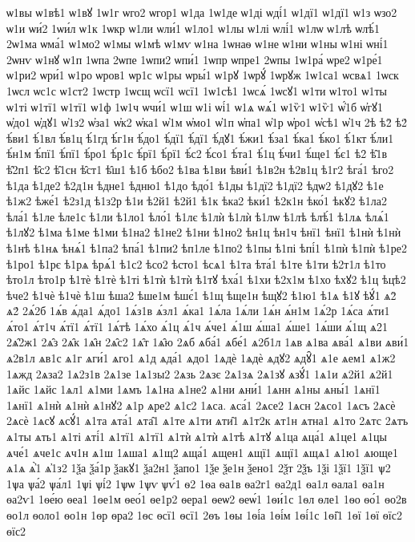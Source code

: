{ѡ1вы
ѡ1вѣ1
ѡ1вꙋ
1ѡ1г
ѡго2
ѡгор1
ѡ1да
1ѡ1де
ѡ1ді
ѡді́1
ѡ1дї1
ѡ1дї1
ѡ1з
ѡзо2
ѡ1и
ѡи́2
1ѡи́л
ѡ1к
1ѡкр
ѡ1ли
ѡли́1
ѡ1ло1
ѡ1лы
ѡ1лі
ѡлі́1
ѡ1лѡ
ѡ1лѣ
ѡлѣ́1
2ѡ1ма
ѡма́1
ѡ1мо2
ѡ1мы
ѡ1мѣ
ѡ1мѵ
ѡ1на
1ѡнаѳ
ѡ1не
ѡ1ни
ѡ1ны
ѡ1ні
ѡні́1
2ѡнѵ
ѡ1нꙋ
ѡ1п
1ѡпа
2ѡпе
1ѡпи2
ѡпи́1
1ѡпр
ѡпре1
2ѡпы
1ѡ1ра́
ѡре2
ѡ1ре́1
ѡ1ри2
ѡри́1
ѡ1ро
ѡров1
ѡр1с
ѡ1ры
ѡры́1
ѡ1рꙋ
1ѡрꙋ́
1ѡрꙋж
1ѡ1са1
ѡсвѧ1
1ѡск
1ѡсл
ѡс1с
ѡ1ст2
1ѡстр
1ѡсщ
ѡсї1
ѡсї1
1ѡ1сѣ1
1ѡсѧ́
1ѡсꙋ1
ѡ1ти
ѡ1то1
ѡ1ты
ѡ1ті
ѡ1тї1
ѡ1тї1
ѡ1ф
1ѡ1ч
ѡчи́1
ѡ1ш
ѡ1і
ѡі́1
ѡ1ѧ
ѡѧ́1
ѡ1ѷ1
ѡ1ѷ1
ѡ҆́1б
ѡ҆гꙋ1
ѡ҆до1
ѡ҆дꙋ1
ѡ҆1з2
ѡ҆за1
ѡ҆к2
ѡ҆ка1
ѡ҆1м
ѡ҆мо1
ѡ҆1п
ѡ҆па1
ѡ҆1р
ѡ҆ро1
ѡ҆сѣ1
ѡ҆1ч
2ѣ
ѣ2̀
ѣ2́
ѣ́ви1
ѣ́1вл
ѣ́в1ц
ѣ́1гд
ѣ́г1н
ѣ́до1
ѣ́дї1
ѣ́дї1
ѣ́дꙋ1
ѣ́жи1
ѣ́за1
ѣ́ка1
ѣ́ко1
ѣ́1кт
ѣ́ли1
ѣ́н1м
ѣ́пї1
ѣ́пї1
ѣ́ро1
ѣ́р1с
ѣ́рї1
ѣ́рї1
ѣ́с2
ѣ́со1
ѣ́та1
ѣ́1ц
ѣ́чи1
ѣ́ще1
ѣ́є1
ѣ2̑
ѣ̑1в
ѣ̑2п1
ѣ̑с2
ѣ̑1сн
ѣ̑ст1
ѣ̑ш1
ѣ1б
ѣбо2
ѣ1ва
ѣ1ви
ѣви́1
ѣ1в2н
ѣ2в1ц
ѣ1г2
ѣга́1
ѣго2
ѣ1да
ѣ1де2
ѣ2д1н
ѣдне1
ѣдню1
ѣ1до
ѣдо́1
ѣ1ды
ѣ1дї2
ѣ1дї2
ѣдѡ2
ѣ1дꙋ2
ѣ1е
ѣ1ж2
ѣже́1
ѣ2з1д
ѣ1з2р
ѣ1и
ѣ2й1
ѣ2й1
ѣ1к
ѣка2
ѣки́1
ѣ2к1н
ѣко́1
ѣкꙋ2
ѣ1ла2
ѣла́1
ѣ1ле
ѣле1с
ѣ1ли
ѣ1ло1
ѣло́1
ѣ1лє
ѣ1лѝ
ѣ1лѝ
ѣ1лѡ
ѣ1лѣ
ѣлѣ́1
ѣ1лѧ
ѣлѧ́1
ѣ1лꙋ2
ѣ1ма
ѣ1ме
ѣ1ми
ѣ1на2
ѣ1не2
ѣ1ни
ѣ1но2
ѣн1ц
ѣн1ч
ѣнї1
ѣнї1
ѣ1нѝ
ѣ1нѝ
ѣ1нѣ
ѣ1нѧ
ѣнѧ́1
ѣ1па2
ѣпа́1
ѣ1пи2
ѣп1ле
ѣ1по2
ѣ1пы
ѣ1пі
ѣпі́1
ѣ1пѝ
ѣ1пѝ
ѣ1ре2
ѣ1ро1
ѣ1рє
ѣ1рѧ
ѣрѧ́1
ѣ1с2
ѣсо2
ѣсто1
ѣсѧ1
ѣ1та
ѣта́1
ѣ1те
ѣ1ти
ѣ2т1л
ѣ1то
ѣто1л
ѣто1р
ѣ1тѐ
ѣ1тѐ
ѣ1ті
ѣ1тѝ
ѣ1тѝ
ѣ1тꙋ
ѣха́1
ѣ1хи
ѣ2х1м
ѣ1хо
ѣхꙋ2
ѣ1ц
ѣцѣ2
ѣче2
ѣ1чѐ
ѣ1чѐ
ѣ1ш
ѣша2
ѣше1м
ѣшє́1
ѣ1щ
ѣще1н
ѣщꙋ2
ѣ1ю1
ѣ1ѧ
ѣ1ꙋ
ѣꙋ́1
ѧ2̀
ѧ2́
2ѧ́2б
1ѧ́в
ѧ́да1
ѧ́до1
1ѧ́з1в
ѧ́зл1
ѧ́ка1
1ѧ́ла
1ѧ́ли
1ѧ́н
ѧ́н1м
1ѧ́2р
1ѧ́са
ѧ́ти1
ѧ́то1
ѧ́т1ч
ѧ́тї1
ѧ́тї1
1ѧ́тѣ
1ѧ́хо
ѧ́1ц
ѧ́1ч
ѧ́че1
ѧ́1ш
ѧ́ша1
ѧ́ше1
1ѧ́ши
ѧ́1щ
ѧ2̑1
2ѧ̑2ж1
2ѧ̑з
2ѧ̑к
1ѧ̑н
2ѧ̑с2
1ѧ̑т
1ѧ̑ю
2ѧб
ѧба́1
ѧбе́1
ѧ2б1л
1ѧв
ѧ1ва
ѧва́1
ѧ1ви
ѧви́1
ѧ2в1л
ѧв1с
ѧ1г
ѧги́1
ѧго1
ѧ1д
ѧда́1
ѧдо1
1ѧдѐ
1ѧдѐ
ѧдꙋ2
ѧдꙋ̑1
ѧ1е
ѧем1
ѧ1ж2
1ѧжд
2ѧза2
1ѧ2з1в
2ѧ1зе
1ѧ1зы2
2ѧзь
2ѧзє
2ѧ1зѧ
2ѧ1зꙋ
ѧзꙋ́1
1ѧ1и
ѧ2й1
ѧ2й1
1ѧйс
1ѧйс
1ѧл1
ѧ1ми
1ѧмъ
1ѧ1на
ѧ1не2
ѧ1ни
ѧни́1
1ѧнн
ѧ1ны
ѧны́1
1ѧнї1
1ѧнї1
ѧ1нѝ
ѧ1нѝ
ѧ1нꙋ2
ѧ1р
ѧре2
ѧ1с2
1ѧса.
ѧса́1
2ѧсе2
1ѧсн
2ѧсо1
1ѧсъ
2ѧсѐ
2ѧсѐ
1ѧсꙋ
ѧсꙋ́1
ѧ1та
ѧта́1
ѧта̑1
ѧ1те
ѧ1ти
ѧти̑1
ѧ1т2к
ѧт1н
ѧтна1
ѧ1то
2ѧтс
2ѧтъ
ѧ1ты
ѧть1
ѧ1ті
ѧті́1
ѧ1тї1
ѧ1тї1
ѧ1тѝ
ѧ1тѝ
ѧ1тѣ
ѧ1тꙋ
ѧ1ца
ѧца́1
ѧ1це1
ѧ1цы
ѧче́1
ѧче1с
ѧч1н
ѧ1ш
1ѧша1
ѧ1щ2
ѧща́1
ѧщен1
ѧщї1
ѧщї1
ѧщѧ1
ѧ1ю1
ѧюще1
ѧ1ѧ
ѧ҆̀1
ѧ҆1з2
1ѯа
ѯа́1р
ѯакꙋ1
ѯа2н1
ѯапо1
1ѯе
ѯе1н
ѯено1
2ѯт
2ѯъ
1ѯі
1ѯї1
1ѯї1
ѱ2
1ѱа
ѱа́2
ѱа́л1
1ѱі
ѱі́2
1ѱѡ
1ѱѵ
ѱѵ́1
ѳ2
1ѳа
ѳа1в
ѳа2г1
ѳа2д1
ѳа1л
ѳала1
ѳа1н
ѳа2ѵ1
1ѳе́ю
ѳеа1
1ѳе1м
ѳео́1
ѳе1р2
ѳера1
ѳеѡ2
ѳеѡ́1
1ѳи́1с
1ѳл
ѳле1
1ѳо
ѳо́1
ѳо2в
ѳо1л
ѳоло1
ѳо1н
1ѳр
ѳра2
1ѳс
ѳсї1
ѳсї1
2ѳъ
1ѳы
1ѳі́а
1ѳі́м
1ѳі́1с
1ѳі̑1
1ѳї
1ѳї
ѳїс2
ѳїс2
}
